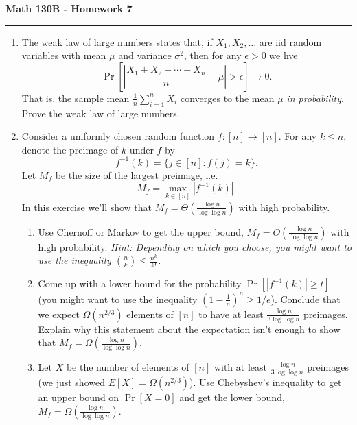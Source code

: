 \documentclass[11pt,letterpaper]{report}
\begin{document}
\begin{center}
{\bf \Large Math 130B - Homework 7}
\vspace{0.2cm}
\hrule
\end{center}

\begin{enumerate}

	\item The weak law of large numbers states that, if $X_1, X_2, \ldots$ are iid random variables with mean $\mu$ and variance $\sigma^2$, then for any $\epsilon>0$ we hve
	\[
	\Pr\left[ \left| \frac{X_1 + X_2 + \cdots + X_n}{n}-\mu\right|>\epsilon\right] \to 0.
	\]
	That is, the sample mean $\frac{1}{n}\sum_{i=1}^nX_i$ converges to the mean $\mu$ \textit{in probability}. Prove the weak law of large numbers.




	\vfill



	\item Consider a uniformly chosen random function $f:[n]\to [n]$. For any $k \leq n$, denote the preimage of $k$ under $f$ by
	\[
	f^{-1}(k) = \{j\in [n]: f(j) = k\}.
	\]
	Let $M_f$ be the size of the largest preimage, i.e.
	\[
	M_f = \max_{k\in [n]}|f^{-1}(k)|.
	\]
	In this exercise we'll show that $M_f = \Theta(\frac{\log n}{\log \log n})$ with high probability.
	\begin{enumerate}%
		\item Use Chernoff or Markov to get the upper bound, $M_f = O(\frac{\log n}{\log \log n})$ with high probability. \textit{Hint: Depending on which you choose, you might want to use the inequality $\binom{n}{k}\leq \frac{n^k}{k!}$.}

		\vfill

		\item Come up with a lower bound for the probability $\Pr[|f^{-1}(k)| \geq t]$ (you might want to use the inequality $(1-\frac{1}{n})^n \geq 1/e$). Conclude that we expect $\Omega(n^{2/3})$ elements of $[n]$ to have at least $\frac{\log n}{3\log \log n}$ preimages. Explain why this statement about the expectation isn't enough to show that $M_f = \Omega(\frac{\log n}{\log \log n})$.
		\vfill

		\item Let $X$ be the number of elements of $[n]$ with at least $\frac{\log n}{3\log \log n}$ preimages (we just showed $E[X] = \Omega(n^{2/3})$). Use Chebyshev's inequality to get an upper bound on $\Pr[X=0]$ and get the lower bound, $M_f = \Omega(\frac{\log n}{\log \log n})$.
	\end{enumerate}
	\vfill\pagebreak




\end{enumerate}
\end{document}
